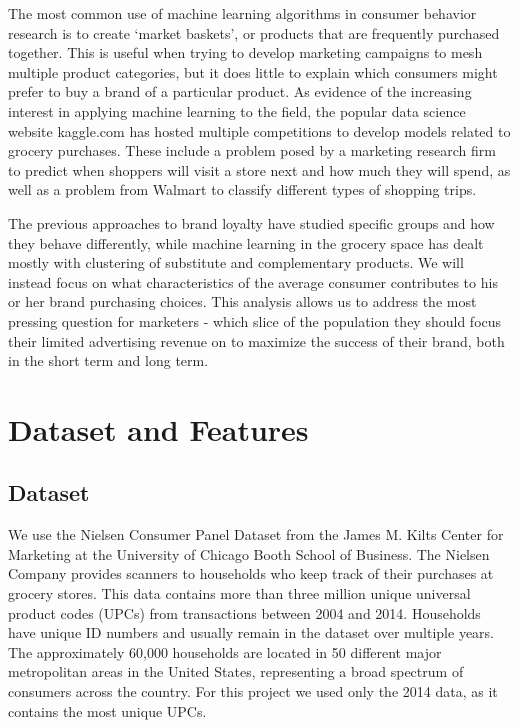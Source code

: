 \documentclass[conference]{IEEEtran}
\begin{document}
The most common use of machine learning algorithms in consumer behavior research is to create ‘market baskets', or products that are frequently purchased together\cite{mcauley2015inferring}. This is useful when trying to develop marketing campaigns to mesh multiple product categories, but it does little to explain which consumers might prefer to buy a brand of a particular product. As evidence of the increasing interest in applying machine learning to the field, the popular data science website kaggle.com has hosted multiple competitions to develop models related to grocery purchases\cite{kaggleDunn}\cite{kaggleWalmart}. These include a problem posed by a marketing research firm to predict when shoppers will visit a store next and how much they will spend, as well as a problem from Walmart to classify different types of shopping trips.


The previous approaches to brand loyalty have studied specific groups and how they behave differently, while machine learning in the grocery space has dealt mostly with clustering of substitute and complementary products. We will instead focus on what characteristics of the average consumer contributes to his or her brand purchasing choices. This analysis allows us to address the most pressing question for marketers - which slice of the population they should focus their limited advertising revenue on to maximize the success of their brand, both in the short term and long term\cite{witten2005data}.

\section{Dataset and Features}

\subsection{Dataset}
We use the Nielsen Consumer Panel Dataset from the James M. Kilts Center for Marketing at the University of Chicago Booth School of Business. The Nielsen Company provides scanners to households who keep track of their purchases at grocery stores. This data contains more than three million unique universal product codes (UPCs) from transactions between 2004 and 2014. Households have unique ID numbers and usually remain in the dataset over multiple years. The approximately 60,000 households are located in 50 different major metropolitan areas in the United States, representing a broad spectrum of consumers across the country. For this project we used only the 2014 data, as it contains the most unique UPCs.
\end{document}
